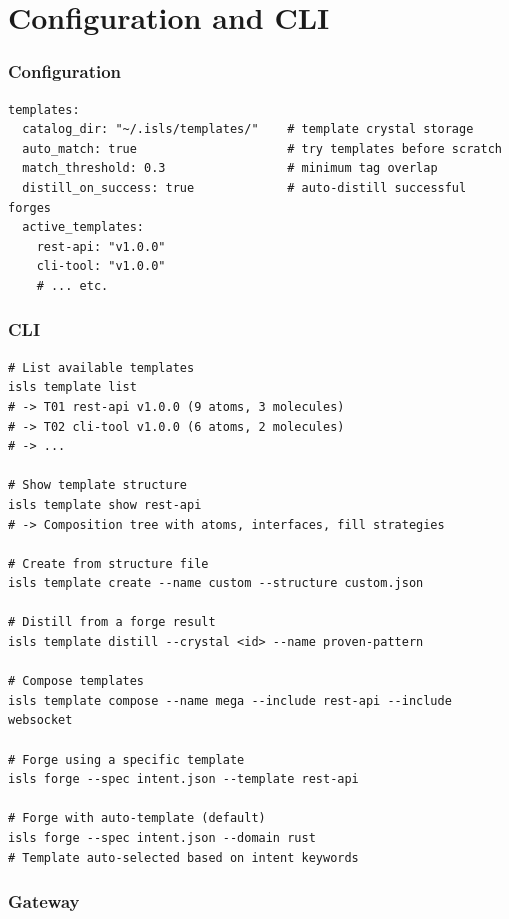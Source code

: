 \documentclass[11pt,a4paper,twoside]{article}
\theoremstyle{definition}
\theoremstyle{plain}
\theoremstyle{remark}
\begin{document}
\part{Configuration and CLI}\label{part:config}

\section{Configuration}\label{sec:config}

\begin{lstlisting}[title={Template Configuration}]
templates:
  catalog_dir: "~/.isls/templates/"    # template crystal storage
  auto_match: true                     # try templates before scratch
  match_threshold: 0.3                 # minimum tag overlap
  distill_on_success: true             # auto-distill successful forges
  active_templates:
    rest-api: "v1.0.0"
    cli-tool: "v1.0.0"
    # ... etc.
\end{lstlisting}

\section{CLI}\label{sec:cli}

\begin{lstlisting}
# List available templates
isls template list
# -> T01 rest-api v1.0.0 (9 atoms, 3 molecules)
# -> T02 cli-tool v1.0.0 (6 atoms, 2 molecules)
# -> ...

# Show template structure
isls template show rest-api
# -> Composition tree with atoms, interfaces, fill strategies

# Create from structure file
isls template create --name custom --structure custom.json

# Distill from a forge result
isls template distill --crystal <id> --name proven-pattern

# Compose templates
isls template compose --name mega --include rest-api --include websocket

# Forge using a specific template
isls forge --spec intent.json --template rest-api

# Forge with auto-template (default)
isls forge --spec intent.json --domain rust
# Template auto-selected based on intent keywords
\end{lstlisting}

\section{Gateway}\label{sec:gateway}
\end{document}
